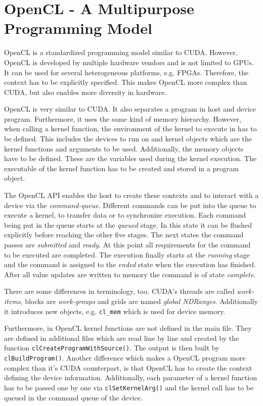 \section{OpenCL - A Multipurpose Programming Model}
\label{sec:OpenCL}
  OpenCL is a standardized programming model similar to CUDA.
  However, OpenCL is developed by multiple hardware vendors and is not limited to GPUs.
  It can be used for several heterogeneous platforms, e.g. FPGAs.
  Therefore, the context has to be explicitly specified.
  This makes OpenCL more complex than CUDA, but also enables more diversity in hardware.~\cite{Rauber.2012}

  OpenCL is very similar to CUDA.
  It also separates a program in host and device program.
  Furthermore, it uses the same kind of memory hierarchy.
  However, when calling a kernel function, the environment of the kernel to execute in has to be defined.
  This includes the devices to run on and kernel objects which are the kernel functions and arguments to be used.
  Additionally, the memory objects have to be defined.
  These are the variables used during the kernel execution.
  The executable of the kernel function has to be created and stored in a program object.~\cite{Khronos.2019}
  
  
  The OpenCL API enables the host to create these contexts and to interact with a device via the \textit{command-queue}.
  Different commands can be put into the queue to execute a kernel, to transfer data or to synchronize execution.
  Each command being put in the queue starts at the \textit{queued} stage.
  In this state it can be flushed explicitly before reaching the other five stages.
  The next states the command passes are \textit{submitted} and \textit{ready}.
  At this point all requirements for the command to be executed are completed.
  The execution finally starts at the \textit{running} stage and the command is assigned to the \textit{ended} state when the execution has finished.
  After all value updates are written to memory the command is of state \textit{complete}.
    
  There are some differences in terminology, too.
  CUDA's threads are called \textit{work-items}, blocks are \textit{work-groups} and grids are named \textit{global NDRanges}.
  Additionally it introduces new objects, e.g. \texttt{cl\_mem} which is used for device memory.
    
  Furthermore, in OpenCL kernel functions are not defined in the main file.
  They are defined in additional files which are read line by line and created by the function \texttt{clCreateProgramWithSource()}.
  The output is then built by \texttt{clBuildProgram()}.
  Another difference which makes a OpenCL program more complex than it's CUDA counterpart, is that OpenCL has to create the context defining the device information.
  Additionally, each parameter of a kernel function has to be passed one by one via \texttt{clSetKernelArg()} and the kernel call has to be queued in the command queue of the device.
